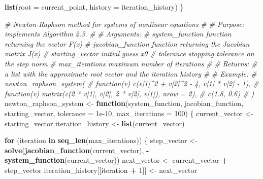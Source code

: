 \documentclass[
]{article}
\newenvironment{Shaded}{\begin{snugshade}}{\end{snugshade}}
\newcommand{\AttributeTok}[1]{\textcolor[rgb]{0.13,0.29,0.53}{#1}}
\newcommand{\CommentTok}[1]{\textcolor[rgb]{0.56,0.35,0.01}{\textit{#1}}}
\newcommand{\ControlFlowTok}[1]{\textcolor[rgb]{0.13,0.29,0.53}{\textbf{#1}}}
\newcommand{\DecValTok}[1]{\textcolor[rgb]{0.00,0.00,0.81}{#1}}
\newcommand{\FloatTok}[1]{\textcolor[rgb]{0.00,0.00,0.81}{#1}}
\newcommand{\FunctionTok}[1]{\textcolor[rgb]{0.13,0.29,0.53}{\textbf{#1}}}
\newcommand{\NormalTok}[1]{#1}
\newcommand{\OtherTok}[1]{\textcolor[rgb]{0.56,0.35,0.01}{#1}}
\newcommand{\SpecialCharTok}[1]{\textcolor[rgb]{0.81,0.36,0.00}{\textbf{#1}}}
\begin{document}
\begin{Shaded}
\begin{Highlighting}[]
  \FunctionTok{list}\NormalTok{(}\AttributeTok{root =}\NormalTok{ current\_point, }\AttributeTok{history =}\NormalTok{ iteration\_history)}
\NormalTok{\}}

\CommentTok{\#\textquotesingle{} Newton{-}Raphson method for systems of nonlinear equations}
\CommentTok{\#\textquotesingle{}}
\CommentTok{\#\textquotesingle{} Purpose: implements Algorithm 2.3.}
\CommentTok{\#\textquotesingle{}}
\CommentTok{\#\textquotesingle{} Arguments:}
\CommentTok{\#\textquotesingle{}   system\_function     function returning the vector F(x)}
\CommentTok{\#\textquotesingle{}   jacobian\_function    function returning the Jacobian matrix J(x)}
\CommentTok{\#\textquotesingle{}   starting\_vector      initial guess x0}
\CommentTok{\#\textquotesingle{}   tolerance            stopping tolerance on the step norm}
\CommentTok{\#\textquotesingle{}   max\_iterations       maximum number of iterations}
\CommentTok{\#\textquotesingle{}}
\CommentTok{\#\textquotesingle{} Returns:}
\CommentTok{\#\textquotesingle{}   a list with the approximate root vector and the iteration history}
\CommentTok{\#\textquotesingle{}}
\CommentTok{\#\textquotesingle{} Example:}
\CommentTok{\#\textquotesingle{}   newton\_raphson\_system(}
\CommentTok{\#\textquotesingle{}     function(v) c(v[1]\^{}2 + v[2]\^{}2 {-} 4, v[1] * v[2] {-} 1),}
\CommentTok{\#\textquotesingle{}     function(v) matrix(c(2 * v[1], v[2], 2 * v[2], v[1]), nrow = 2),}
\CommentTok{\#\textquotesingle{}     c(1.8, 0.6)}
\CommentTok{\#\textquotesingle{}   )}
\NormalTok{newton\_raphson\_system }\OtherTok{\textless{}{-}} \ControlFlowTok{function}\NormalTok{(system\_function, jacobian\_function, starting\_vector,}
                                   \AttributeTok{tolerance =} \FloatTok{1e{-}10}\NormalTok{, }\AttributeTok{max\_iterations =} \DecValTok{100}\NormalTok{) \{}
\NormalTok{  current\_vector }\OtherTok{\textless{}{-}}\NormalTok{ starting\_vector}
\NormalTok{  iteration\_history }\OtherTok{\textless{}{-}} \FunctionTok{list}\NormalTok{(current\_vector)}

  \ControlFlowTok{for}\NormalTok{ (iteration }\ControlFlowTok{in} \FunctionTok{seq\_len}\NormalTok{(max\_iterations)) \{}
\NormalTok{    step\_vector }\OtherTok{\textless{}{-}} \FunctionTok{solve}\NormalTok{(}\FunctionTok{jacobian\_function}\NormalTok{(current\_vector), }\SpecialCharTok{{-}}\FunctionTok{system\_function}\NormalTok{(current\_vector))}
\NormalTok{    next\_vector }\OtherTok{\textless{}{-}}\NormalTok{ current\_vector }\SpecialCharTok{+}\NormalTok{ step\_vector}
\NormalTok{    iteration\_history[[iteration }\SpecialCharTok{+} \DecValTok{1}\NormalTok{]] }\OtherTok{\textless{}{-}}\NormalTok{ next\_vector}


\end{Highlighting}
\end{Shaded}
\end{document}
